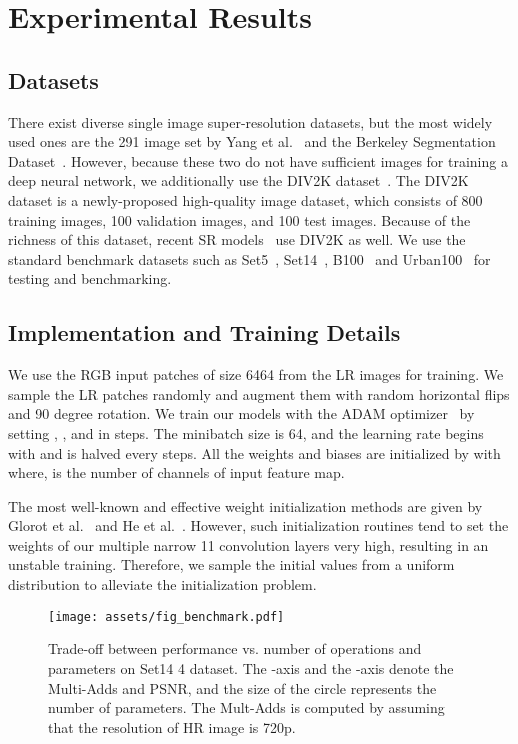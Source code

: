 \documentclass[runningheads]{llncs}
\begin{document}
\section{Experimental Results}
\label{sec:experiments}

\subsection{Datasets}
\label{subsec:dataset}
There exist diverse single image super-resolution datasets, but the most widely used ones are the 291 image set by Yang et al.~\cite{yang2010} and the Berkeley Segmentation Dataset~\cite{bsd2011}. However, because these two do not have sufficient images for training a deep neural network, we additionally use the DIV2K dataset~\cite{div2k}. The DIV2K dataset is a newly-proposed high-quality image dataset, which consists of 800 training images, 100 validation images, and 100 test images. Because of the richness of this dataset, recent SR models~\cite{mdsr2017,btsrn2017,cnf2017,selnet} use DIV2K as well. We use the standard benchmark datasets such as Set5~\cite{set5}, Set14~\cite{yang2010}, B100~\cite{b100} and Urban100~\cite{urban100} for testing and benchmarking.

\subsection{Implementation and Training Details}
\label{subsec:implementation}
We use the RGB input patches of size 6464 from the LR images for training. We sample the LR patches randomly and augment them with random horizontal flips and 90 degree rotation. We train our models with the ADAM optimizer~\cite{adam} by setting , , and  in  steps. The minibatch size is 64, and the learning rate begins with  and is halved every  steps. All the weights and biases are initialized by  with  where,  is the number of channels of input feature map.

The most well-known and effective weight initialization methods are given by Glorot et al.~\cite{glorot2010} and He et al.~\cite{he2015delving}. However, such initialization routines tend to set the weights of our multiple narrow 11 convolution layers very high, resulting in an unstable training. Therefore, we sample the initial values from a uniform distribution to alleviate the initialization problem.

\begin{figure}[t]
    \centering
    \texttt{[image: assets/fig\_benchmark.pdf]}
    \caption{Trade-off between performance vs. number of operations and parameters on Set14 4 dataset. The -axis and the -axis denote the Multi-Adds and PSNR, and the size of the circle represents the number of parameters. The Mult-Adds is computed by assuming that the resolution of HR image is 720p.}
    \label{fig:benchmark}
\end{figure}
\end{document}
